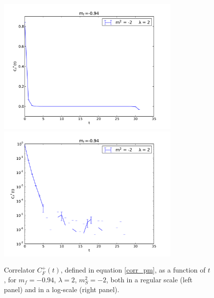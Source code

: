 \begin{figure}[thb] 
\begin{adjustwidth}{-4em}{-4em}
  \includegraphics[width=9cm,clip]{pics/spectrum_plus}\includegraphics[width=9cm,clip]{pics/spectrum_plus_log}
\end{adjustwidth}
  \caption{Correlator $C_F^+(t)$, defined in equation \ref{corr_pm}, as a function of $t$, for $m_f = -0.94$, $\lambda = 2$, $m_S^2 = -2$, both in a regular scale (left panel) and in a log-scale (right panel).}
  \label{spectrum_parity_plus}
\end{figure}

